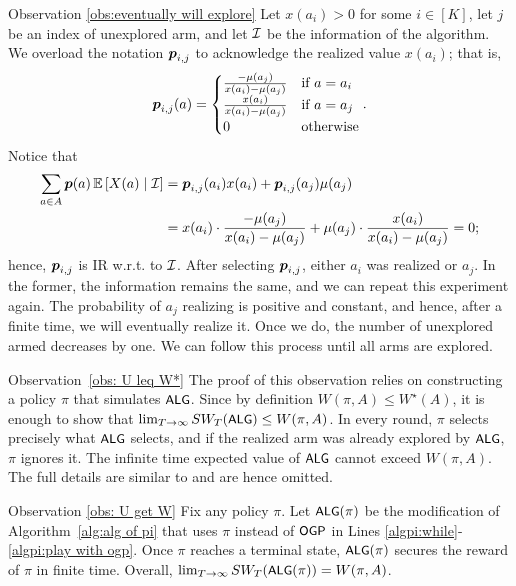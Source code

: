 \begin{proofof}{Observation \ref{obs:eventually will explore}}
Let $x(a_i)>0$ for some $i\in [K]$, let $j$ be an index of unexplored arm, and let $\mathcal{I}$ be the information of the algorithm. We overload the notation $\boldsymbol{ p }_{i,j}$ to acknowledge the realized value $x(a_i)$; that is,
\begin{align*}
\boldsymbol{ p }_{i,j}(a) =
\begin{cases}
\frac{-\mu(a_j)}{x(a_i)-\mu(a_j)} & \textnormal{if } a=a_i\\
\frac{x(a_i)}{x(a_i)-\mu(a_j)} & \textnormal{if } a=a_j\\
0 & \textnormal{otherwise}
\end{cases}.
\end{align*}
Notice that 
\begin{align*}
\sum_{a\in A}\boldsymbol{ p }(a)\operatorname{\mathbb{E}}\left[X(a)\mid \mathcal{I}\right] &= \boldsymbol{ p }_{i,j}(a_i)x(a_i)  + \boldsymbol{ p }_{i,j}(a_j)\mu(a_j) \\
&= x(a_i)\cdot \frac{-\mu(a_j)}{x(a_i)-\mu(a_j)} + \mu(a_j)\cdot \frac{x(a_i)}{x(a_i)-\mu(a_j)} = 0;  
\end{align*}
hence, $\boldsymbol{ p }_{i,j}$ is IR w.r.t. to $\mathcal{I}$. After selecting $\boldsymbol{ p }_{i,j}$, either $a_i$ was realized or $a_j$. In the former, the information remains the same, and we can repeat this experiment again. The probability of $a_j$ realizing is positive and constant, and hence, after a finite time, we will eventually realize it. Once we do, the number of unexplored armed decreases by one. We can follow this process until all arms are explored.
\end{proofof}

\begin{proofof}{Observation~\ref{obs: U leq W*}}
The proof of this observation relies on constructing a policy $\pi$ that simulates ${\small\textnormal{\textsf{ALG}}}$. Since by definition $W(\pi,A) \leq  W^\star(A)$, it is enough to show that $\lim_{T \rightarrow \infty }SW_T({\small\textnormal{\textsf{ALG}}}) \leq W(\pi,A)$. In every round, $\pi$ selects precisely what ${\small\textnormal{\textsf{ALG}}}$ selects, and if the realized arm was already explored by ${\small\textnormal{\textsf{ALG}}}$, $\pi$ ignores it. The infinite time expected value of ${\small\textnormal{\textsf{ALG}}}$ cannot exceed $ W(\pi,A)$. The full details are similar to \cite[Theorem 3]{Fiduciary} and are hence omitted. 
\end{proofof}

\begin{proofof}{Observation \ref{obs: U get W}}
Fix any policy $\pi$. Let ${\small\textnormal{\textsf{ALG}}}(\pi)$ be the modification of Algorithm~\ref{alg:alg of pi} that uses $\pi$ instead of ${\small\textnormal{\textsf{OGP}}}$ in Lines \ref{algpi:while}-\ref{algpi:play with ogp}. Once $\pi$ reaches a terminal state, ${\small\textnormal{\textsf{ALG}}}(\pi)$ secures the reward of $\pi$ in finite time. Overall, $\lim_{T \rightarrow \infty }SW_T({\small\textnormal{\textsf{ALG}}}(\pi)) = W(\pi,A)$.
\end{proofof}


